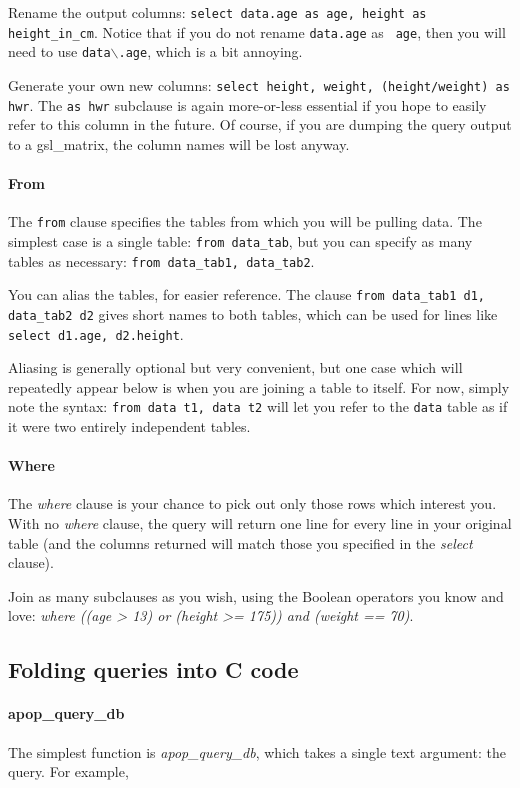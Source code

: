 Rename the output columns: {\tt select data.age as age, height as
height_in_cm}. Notice that if you do not rename {\tt data.age} as {\tt
age}, then you will need to use {\tt data$\backslash$.age}, which is a
bit annoying.

Generate your own new columns: {\tt select height, weight, (height/weight)
as hwr}. The {\tt as hwr} subclause is again more-or-less
essential if you hope to easily refer to this column in the future. Of
course, if you are dumping the query output to a gsl\_matrix, the column
names will be lost anyway.

\paragraph{From} The {\tt from} clause specifies the tables from which
you will be pulling data. The simplest case is a single table: {\tt from
data_tab}, but you can specify as many tables as necessary: {\tt from
data_tab1, data_tab2}. 

You can alias the tables, for easier reference. The clause {\tt from
data_tab1 d1, data_tab2 d2} gives short names to both tables, which can
be used for lines like {\tt select d1.age, d2.height}. 

Aliasing is generally optional but very convenient, but one case which
will repeatedly appear below is when you are joining a table to itself.
For now, simply note the syntax: {\tt from data t1, data t2} will let
you refer to the {\tt data} table as if it were two entirely independent
tables. 

\paragraph{Where}
The {\sl where} clause is your chance to pick out only those rows which
interest you. With no {\sl where} clause, the query will return one line
for every line in your original table (and the columns returned will
match those you specified in the {\sl select} clause).

Join as many subclauses as you wish, using the Boolean operators you
know and love: {\sl where ((age > 13) or (height >= 175)) and (weight == 70)}.

\subsection{Folding queries into C code} 

\paragraph{apop\_query\_db} The simplest function is {\sl
apop_query_db}, which takes a single text argument: the query. For
example,


